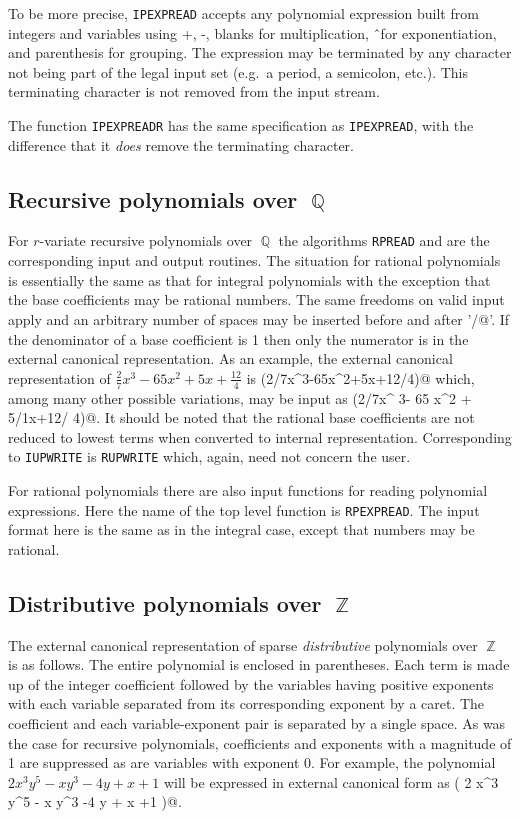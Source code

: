 To be more precise, {\tt IPEXPREAD} accepts any polynomial expression built
from integers and variables using +, -, blanks for multiplication, \^\ for
exponentiation, and parenthesis for grouping. The expression may be
terminated by any character not being part of the legal input set (e.g.\ a
period, a semicolon, etc.). This terminating character is not removed from
the input stream.

The function {\tt IPEXPREADR} has the same specification as {\tt IPEXPREAD},
with the difference that it {\em does} remove the terminating character.


\subsection{Recursive polynomials over $\BbbQ$}
For $r$-variate recursive polynomials over $\BbbQ$ the algorithms {\tt RPREAD}
and  are the corresponding input and output routines.
The situation for rational polynomials is essentially the same as that for
integral polynomials with the exception that the base coefficients may be
rational numbers.  The same freedoms on valid input apply and an arbitrary
number of spaces may be inserted before and after '\verb@/@'.  If the
denominator of a base coefficient is 1 then only the numerator is in the
external canonical representation.  As an example, the external canonical
representation of $\frac{2}{7}x^3-65x^2+5x+\frac{12}{4}$ is
\verb@(2/7x^3-65x^2+5x+12/4)@ which, among many other possible
variations, may be input as \verb@(2/7x^ 3- 65 x^2 + 5/1x+12/ 4)@.  It
should be noted that the rational base coefficients are not reduced to
lowest terms when converted to internal representation.  Corresponding
to {\tt IUPWRITE} is {\tt RUPWRITE} which, again, need not concern the
user.

For rational polynomials there are also input functions for reading polynomial
expressions. Here the name of the top level function is {\tt RPEXPREAD}. The
input format here is the same as in the integral case, except that numbers may
be rational.

\subsection{Distributive polynomials over $\BbbZ$}
The external canonical representation of sparse {\em distributive}
polynomials over $\BbbZ$ is as follows.  The entire polynomial is
enclosed in parentheses.  Each term is made up of the integer
coefficient followed by the variables having positive exponents with
each variable separated from its corresponding exponent by a caret.
The coefficient and each variable-exponent pair is separated by a
single space.  As was the case for recursive polynomials, coefficients
and exponents with a magnitude of 1 are suppressed as are variables
with exponent 0.  For example, the polynomial $2x^3y^5-xy^3-4y+x+1$
will be expressed in external canonical form as
\verb@( 2 x^3 y^5 - x y^3 -4 y + x +1 )@.

